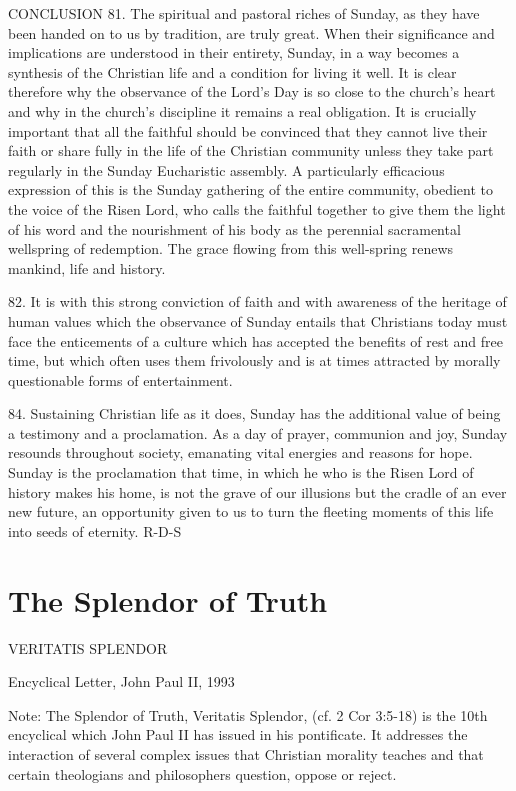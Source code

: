 \documentclass[oneside]{book}
\begin{document}
CONCLUSION
81. The spiritual and pastoral riches of Sunday, as they have been handed on to
us by tradition, are truly great. When their significance and implications are
understood in their entirety, Sunday, in a way becomes a synthesis of the
Christian life and a condition for living it well. It is clear therefore why the
observance of the Lord's Day is so close to the church's heart and why in the
church's discipline it remains a real obligation. It is crucially important that
all the faithful should be convinced that they cannot live their faith or share
fully in the life of the Christian community unless they take part regularly in
the Sunday Eucharistic assembly. A particularly efficacious expression of this
is the Sunday gathering of the entire community, obedient to the voice of the
Risen Lord, who calls the faithful together to give them the light of his word
and the nourishment of his body as the perennial sacramental wellspring of
redemption. The grace flowing from this well-spring renews mankind, life and
history.

82. It is with this strong conviction of faith and with awareness of the
heritage of human values which the observance of Sunday entails that Christians
today must face the enticements of a culture which has accepted the benefits of
rest and free time, but which often uses them frivolously and is at times
attracted by morally questionable forms of entertainment.

84. Sustaining Christian life as it does, Sunday has the additional value of
being a testimony and a proclamation. As a day of prayer, communion and joy,
Sunday resounds throughout society, emanating vital energies and reasons for
hope. Sunday is the proclamation that time, in which he who is the Risen Lord of
history makes his home, is not the grave of our illusions but the cradle of an
ever new future, an opportunity given to us to turn the fleeting moments of this
life into seeds of eternity.
R-D-S


\chapter{The Splendor of Truth}

VERITATIS SPLENDOR

Encyclical Letter, John Paul II, 1993

Note: The Splendor of Truth, Veritatis Splendor, (cf. 2 Cor 3:5-18) is the 10th
encyclical which John Paul II has issued in his pontificate. It addresses the
interaction of several complex issues that Christian morality teaches and that
certain theologians and philosophers question, oppose or reject.
\end{document}
